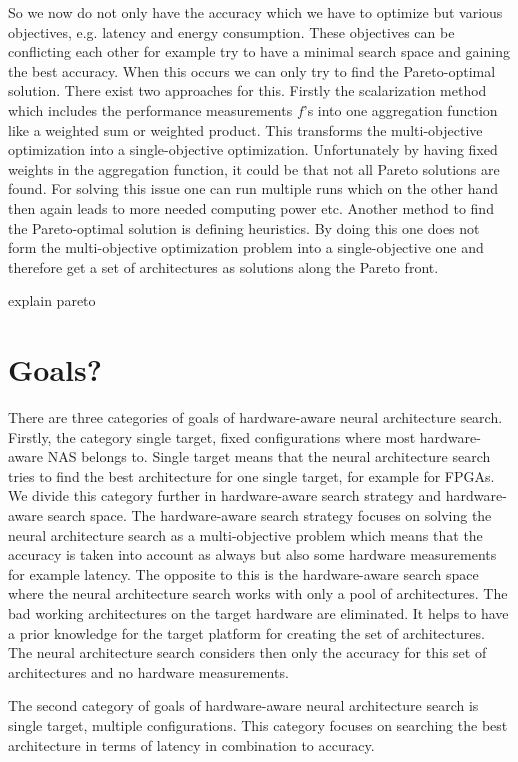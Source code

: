 \documentclass[conference]{IEEEtran}
\begin{document}
So we now do not only have the accuracy which we have to optimize but various objectives, e.g. latency and energy consumption. These objectives can be conflicting each other for example try to have a minimal search space and gaining the best accuracy. When this occurs we can only try to find the Pareto-optimal solution. There exist two approaches for this. Firstly the scalarization method which includes the performance measurements $f$'s into one aggregation function like a weighted sum or weighted product. This transforms the multi-objective optimization into a single-objective optimization. Unfortunately by having fixed weights in the aggregation function, it could be that not all Pareto solutions are found. For solving this issue one can run multiple runs which on the other hand then again leads to more needed computing power etc. Another method to find the Pareto-optimal solution is defining heuristics. By doing this one does not form the multi-objective optimization problem into a single-objective one and therefore get a set of architectures as solutions along the Pareto front. 

explain pareto 

\section{Goals?}
There are three categories of goals of hardware-aware neural architecture search. Firstly, the category single target, fixed configurations where most hardware-aware NAS belongs to. Single target means that the neural architecture search tries to find the best architecture for one single target, for example for FPGAs. We divide this category further in hardware-aware search strategy and hardware-aware search space. The hardware-aware search strategy focuses on solving the neural architecture search as a multi-objective problem which means that the accuracy is taken into account as always but also some hardware measurements for example latency. The opposite to this is the hardware-aware search space where the neural architecture search works with only a pool of architectures. The bad working architectures on the target hardware are eliminated. It helps to have a prior knowledge for the target platform for creating the set of architectures. The neural architecture search considers then only the accuracy for this set of architectures and no hardware measurements.

The second category of goals of hardware-aware neural architecture search is single target, multiple configurations. This category focuses on searching the best architecture in terms of latency in combination to accuracy. 
\end{document}
